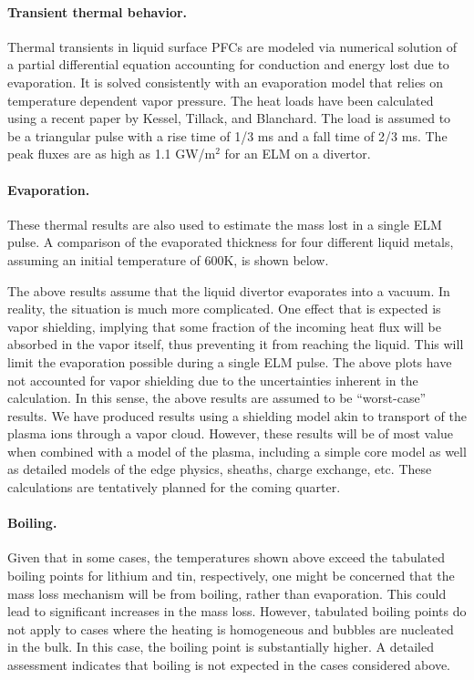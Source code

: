 \paragraph{Transient thermal behavior.} Thermal transients in liquid surface
\glspl{PFC} are modeled via numerical solution of a partial differential
equation accounting for conduction and energy lost due to evaporation. It is
solved consistently with an evaporation model that relies on temperature
dependent vapor pressure. The heat loads have been calculated using a recent
paper by Kessel, Tillack, and Blanchard. The load is assumed to be a
triangular pulse with a rise time of 1/3 ms and a fall time of 2/3 ms. The peak
fluxes are as high as 1.1 GW/m$^2$ for an \gls{ELM} on a divertor.

\paragraph{Evaporation.} These thermal results are also used to estimate
the mass lost in a single \gls{ELM} pulse. A comparison of the evaporated thickness
for four different liquid metals, assuming an initial temperature of 600K, is
shown below.

The above results assume that the liquid divertor evaporates into a vacuum. In
reality, the situation is much more complicated. One effect that is expected
is vapor shielding, implying that some fraction of the incoming heat flux will
be absorbed in the vapor itself, thus preventing it from reaching the
liquid. This will limit the evaporation possible during a single \gls{ELM}
pulse. The above plots have not accounted for vapor shielding due to the
uncertainties inherent in the calculation. In this sense, the above results
are assumed to be “worst-case” results. We have produced results using a
shielding model akin to transport of the plasma ions through a vapor
cloud. However, these results will be of most value when combined with a model
of the plasma, including a simple core model as well as detailed models of the
edge physics, sheaths, charge exchange, etc. These calculations are
tentatively planned for the coming quarter.

\paragraph{Boiling. } Given that in some cases, the temperatures shown
above exceed the tabulated boiling points for lithium and tin, respectively,
one might be concerned that the mass loss mechanism will be from boiling,
rather than evaporation. This could lead to significant increases in the mass
loss. However, tabulated boiling points do not apply to cases where the
heating is homogeneous and bubbles are nucleated in the bulk. In this case,
the boiling point is substantially higher. A detailed assessment indicates
that boiling is not expected in the cases considered above.

